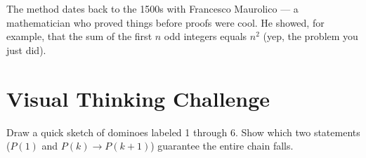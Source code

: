 \documentclass[12pt]{article}
\begin{document}
The method dates back to the 1500s with Francesco Maurolico — a mathematician who proved things before proofs were cool.  
He showed, for example, that the sum of the first $n$ odd integers equals $n^2$ (yep, the problem you just did).

\section*{Visual Thinking Challenge}

Draw a quick sketch of dominoes labeled 1 through 6.  
Show which two statements ($P(1)$ and $P(k)\rightarrow P(k+1)$) guarantee the entire chain falls.

\vfill
\begin{center}
\end{center}
\end{document}
